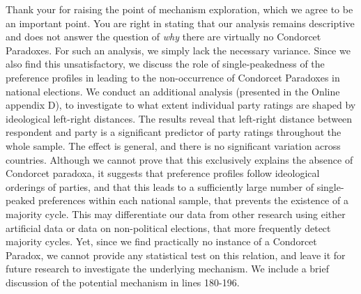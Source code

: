 \documentclass[a4paper, 12pt]{scrartcl}
\theoremstyle{break}
\begin{document}
Thank your for raising the point of mechanism exploration, which we agree to be an important point. You are right in stating that our analysis remains descriptive and does not answer the question of \textit{why} there are virtually no Condorcet Paradoxes. For such an analysis, we simply lack the necessary variance. Since we also find this unsatisfactory, we discuss the role of single-peakedness of the preference profiles in leading to the non-occurrence of Condorcet Paradoxes in national elections. We conduct an additional analysis (presented in the Online appendix D), to investigate to what extent individual party ratings are shaped by ideological left-right distances. The results reveal that left-right distance between respondent and party is a significant predictor of party ratings throughout the whole sample. The effect is general, and there is no significant variation across countries. Although we cannot prove that this exclusively explains the absence of Condorcet paradoxa, it suggests that preference profiles follow ideological orderings of parties, and that this leads to a sufficiently large number of single-peaked preferences within each national sample, that prevents the existence of a majority cycle. This may differentiate our data from other research using either artificial data or data on non-political elections, that more frequently detect majority cycles. Yet, since we find practically no instance of a Condorcet Paradox, we cannot provide any statistical test on this relation, and leave it for future research to investigate the underlying mechanism. We include a brief discussion of the potential mechanism in lines 180-196.

\end{document}
